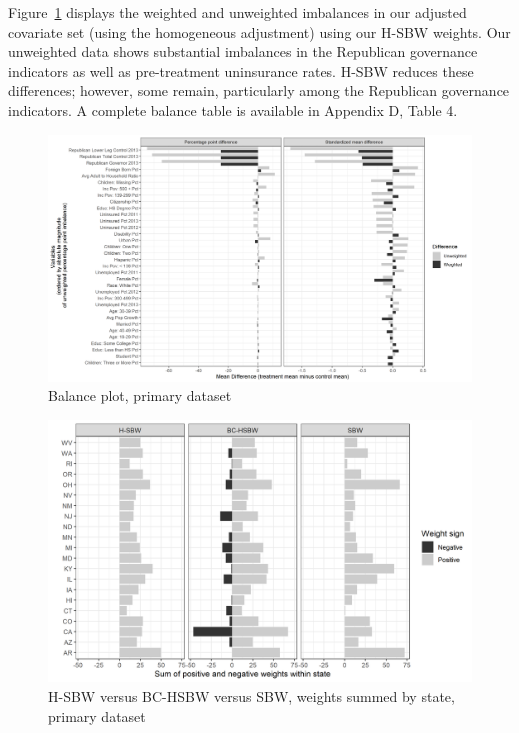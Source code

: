 \documentclass[aoas]{imsart}
\theoremstyle{plain}
\theoremstyle{remark}
\begin{document}
Figure~\ref{fig:loveplotc1} displays the weighted and unweighted imbalances in our adjusted covariate set (using the homogeneous adjustment) using our H-SBW weights. Our unweighted data shows substantial imbalances in the Republican governance indicators as well as pre-treatment uninsurance rates. H-SBW reduces these differences; however, some remain, particularly among the Republican governance indicators. A complete balance table is available in Appendix D, Table 4. 

\begin{figure}[H]
\begin{center}
    \caption{Balance plot, primary dataset}
    \label{fig:loveplotc1}
    \includegraphics[scale=0.45]{01_Plots/balance-plot-all-etuc1.png}
\end{center}
\end{figure}

\begin{figure}[H]
\begin{center}
    \caption{H-SBW versus BC-HSBW versus SBW, weights summed by state, primary dataset}
    \label{fig:sbwvhsbw1}
    \includegraphics[scale=0.55]{01_Plots/weights-by-state-sbw-hsbw-c1.png}
\end{center}
\end{figure}
\end{document}
